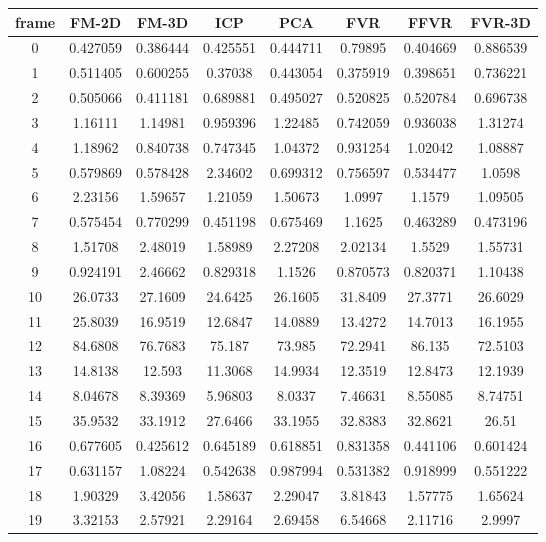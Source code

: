 \begin{figure}
\centering
\begin{tabular}{cccccccc}
\hline
\textbf{frame} & \textbf{FM-2D} & \textbf{FM-3D} & \textbf{ICP} & \textbf{PCA} & \textbf{FVR} & \textbf{FFVR} & \textbf{FVR-3D}
\\ \hline
0 & 0.427059 & 0.386444 & 0.425551 & 0.444711 & 0.79895 & 0.404669 & 0.886539\\
1 & 0.511405 & 0.600255 & 0.37038 & 0.443054 & 0.375919 & 0.398651 & 0.736221\\
2 & 0.505066 & 0.411181 & 0.689881 & 0.495027 & 0.520825 & 0.520784 & 0.696738\\
3 & 1.16111 & 1.14981 & 0.959396 & 1.22485 & 0.742059 & 0.936038 & 1.31274\\
4 & 1.18962 & 0.840738 & 0.747345 & 1.04372 & 0.931254 & 1.02042 & 1.08887\\
5 & 0.579869 & 0.578428 & 2.34602 & 0.699312 & 0.756597 & 0.534477 & 1.0598\\
6 & 2.23156 & 1.59657 & 1.21059 & 1.50673 & 1.0997 & 1.1579 & 1.09505\\
7 & 0.575454 & 0.770299 & 0.451198 & 0.675469 & 1.1625 & 0.463289 & 0.473196\\
8 & 1.51708 & 2.48019 & 1.58989 & 2.27208 & 2.02134 & 1.5529 & 1.55731\\
9 & 0.924191 & 2.46662 & 0.829318 & 1.1526 & 0.870573 & 0.820371 & 1.10438\\
10 & 26.0733 & 27.1609 & 24.6425 & 26.1605 & 31.8409 & 27.3771 & 26.6029\\
11 & 25.8039 & 16.9519 & 12.6847 & 14.0889 & 13.4272 & 14.7013 & 16.1955\\
12 & 84.6808 & 76.7683 & 75.187 & 73.985 & 72.2941 & 86.135 & 72.5103\\
13 & 14.8138 & 12.593 & 11.3068 & 14.9934 & 12.3519 & 12.8473 & 12.1939\\
14 & 8.04678 & 8.39369 & 5.96803 & 8.0337 & 7.46631 & 8.55085 & 8.74751\\
15 & 35.9532 & 33.1912 & 27.6466 & 33.1955 & 32.8383 & 32.8621 & 26.51\\
16 & 0.677605 & 0.425612 & 0.645189 & 0.618851 & 0.831358 & 0.441106 & 0.601424\\
17 & 0.631157 & 1.08224 & 0.542638 & 0.987994 & 0.531382 & 0.918999 & 0.551222\\
18 & 1.90329 & 3.42056 & 1.58637 & 2.29047 & 3.81843 & 1.57775 & 1.65624\\
19 & 3.32153 & 2.57921 & 2.29164 & 2.69458 & 6.54668 & 2.11716 & 2.9997\\

\end{tabular}
\end{figure}
